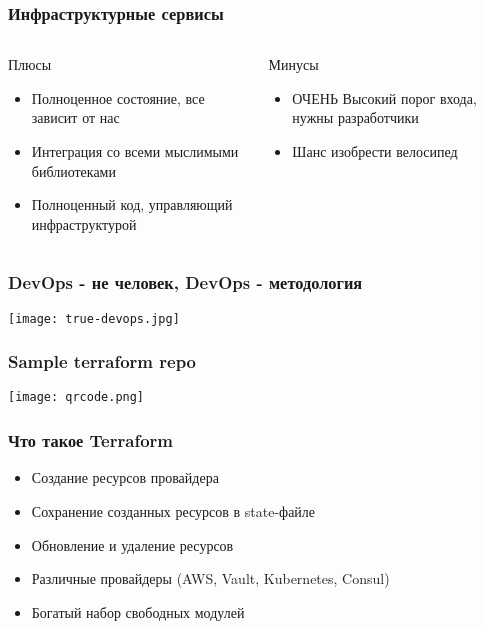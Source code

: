 \documentclass[mathserif,serif]{beamer}
\begin{document}
\begin{frame}
	\frametitle{Инфраструктурные сервисы}
	\begin{columns}[T]
		\begin{column}{.5\linewidth}
			\begin{minipage}[c][\textheight][c]{\linewidth}
          			Плюсы
				\begin{itemize}
					\item{Полноценное состояние, все зависит от нас}
					\item{Интеграция со всеми мыслимыми библиотеками}
					\item{Полноценный код, управляющий инфраструктурой}
				\end{itemize}
			\end{minipage}
		\end{column}
		\begin{column}{.5\linewidth}
			\begin{minipage}[c][\textheight][c]{\linewidth}
          			Минусы
				\begin{itemize}
					\item{ОЧЕНЬ Высокий порог входа, нужны разработчики}
					\item{Шанс изобрести велосипед}
				\end{itemize}
			\end{minipage}
		\end{column}
	\end{columns}
\end{frame}

\begin{frame}
	\frametitle{DevOps - не человек, DevOps - методология}
	\texttt{[image: true-devops.jpg]}
\end{frame}

\begin{frame}
	\frametitle{Sample terraform repo}
	\texttt{[image: qrcode.png]}
\end{frame}

\begin{frame}
	\frametitle{Что такое Terraform}
				\begin{itemize}
					\item{Создание ресурсов провайдера}
					\item{Сохранение созданных ресурсов в state-файле}
					\item{Обновление и удаление ресурсов}
					\item{Различные провайдеры (AWS, Vault, Kubernetes, Consul)}
					\item{Богатый набор свободных модулей}
				\end{itemize}
\end{frame}
\end{document}
